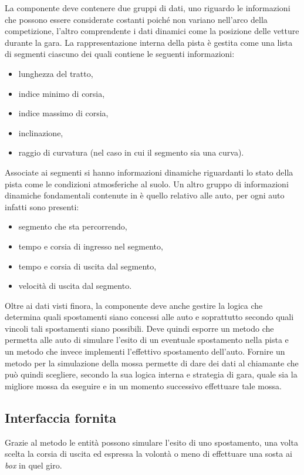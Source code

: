 La componente \track{} deve contenere due gruppi di dati, uno riguardo le informazioni che possono essere considerate costanti poiché non variano nell'arco della competizione, l'altro comprendente i dati dinamici come la posizione delle vetture durante la gara.
La rappresentazione interna della pista è gestita come una lista di segmenti ciascuno dei quali contiene le seguenti informazioni:
\begin{itemize}
\item lunghezza del tratto,
\item indice minimo di corsia,
\item indice massimo di corsia,
\item inclinazione,
\item raggio di curvatura (nel caso in cui il segmento sia una curva).
\end{itemize}
Associate ai segmenti si hanno informazioni dinamiche riguardanti lo stato della pista come le condizioni atmosferiche al suolo.
Un altro gruppo di informazioni dinamiche fondamentali contenute in \track{} è quello relativo alle auto, per ogni auto infatti sono presenti:
\begin{itemize}
\item segmento che sta percorrendo,
\item tempo e corsia di ingresso nel segmento,
\item tempo e corsia di uscita dal segmento,
\item velocità di uscita dal segmento.
\end{itemize}

Oltre ai dati visti finora, la componente \track{} deve anche gestire la logica che determina quali spostamenti siano concessi alle auto e soprattutto secondo quali vincoli tali spostamenti siano possibili. Deve quindi esporre un metodo che permetta alle auto di simulare l'esito di un eventuale spostamento nella pista e un metodo che invece implementi l'effettivo spostamento dell'auto. Fornire un metodo per la simulazione della mossa permette di dare dei dati al chiamante che può quindi scegliere, secondo la sua logica interna e strategia di gara, quale sia la migliore mossa da eseguire e in un momento successivo effettuare tale mossa.

\subsection*{Interfaccia fornita}
Grazie al metodo  le entità \car{} possono simulare l'esito di uno spostamento, una volta scelta la corsia di uscita ed espressa la volontà o meno di effettuare una sosta ai \textit{box} in quel giro.


